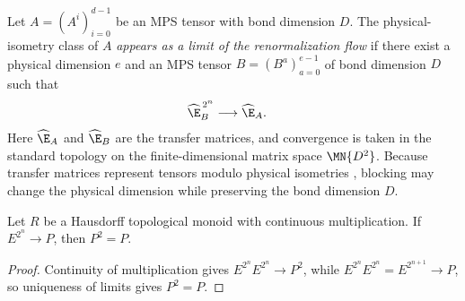 \begin{definition}
    \label{def:appears_as_renormalization_flow_limit}
    \leanok
    Let $A=(A^i)_{i=0}^{d-1}$ be an MPS tensor with bond dimension $D$. The
    physical-isometry class of $A$ \emph{appears as a limit of the
        renormalization flow} if there exist a physical dimension $e$ and an MPS
    tensor $B=(B^a)_{a=0}^{e-1}$ of bond dimension $D$ such that
    \begin{align}
        \widehat{\E}_B^{\,2^n}
         & \longrightarrow \widehat{\E}_A.
        \notag
    \end{align}
    Here $\widehat{\E}_A$ and $\widehat{\E}_B$ are the transfer matrices, and
    convergence is taken in the standard topology on the finite-dimensional
    matrix space $\MN{D^2}$. Because transfer matrices represent tensors modulo
    physical isometries \cite[lines~382--394 and 1205--1209]{Cirac2016MPDO_arXiv},
    blocking may change the physical dimension while preserving the bond
    dimension $D$.
\end{definition}

\begin{lemma}
    \label{thm:dyadic_power_limit_idempotent}
    \leanok
    Let $R$ be a Hausdorff topological monoid with continuous multiplication.
    If $E^{2^n}\to P$, then $P^2=P$.
\end{lemma}
\begin{proof}\leanok
    Continuity of multiplication gives
    $E^{2^n}E^{2^n}\to P^2$, while $E^{2^n}E^{2^n}=E^{2^{n+1}}\to P$, so
    uniqueness of limits gives $P^2=P$.
\end{proof}

